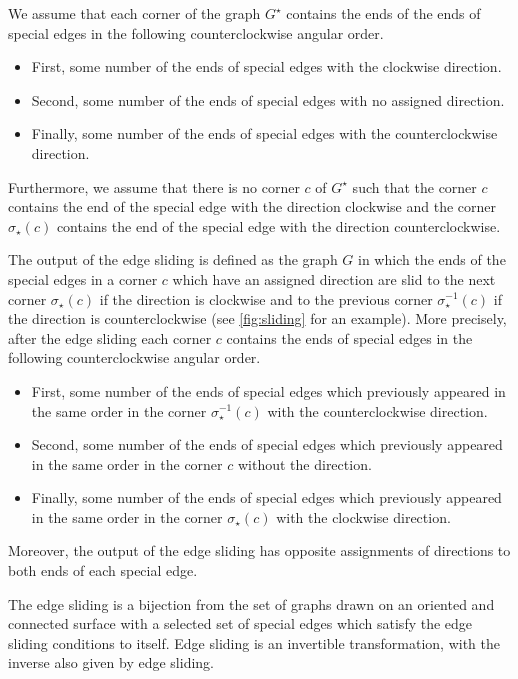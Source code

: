 \documentclass[submission]{FPSAC2021}
\DeclareMathOperator{\res}{\star}
\begin{document}
We assume that each corner of the 
graph $G^{\res}$ contains the ends 
of the ends of special edges in the 
following  counterclockwise angular 
order.  
\begin{itemize}

\item First, some number of the 
		ends of special edges 
		with the clockwise 
		direction.

\item Second, some number of the 
		ends of special edges with 
		no assigned direction. 
\item Finally, some number of the
		ends of special edges with 
		the counterclockwise 
		direction. 
\end{itemize}  
Furthermore, we assume that there is no 
corner $c$ of $G^{\res}$ such that the corner 
$c$ contains the end of the special 
edge with the direction clockwise and 
the corner $\sigma_{\res}(c)$ contains the end 
of the  special edge with the direction 
counterclockwise.

The output of the edge sliding is defined 
as the graph $G$ in which the ends of the 
special edges in a corner $c$ which have 
an assigned direction are slid to the 
next corner $\sigma_{\res}(c)$ if the direction 
is clockwise and to the previous corner 
$\sigma_{\res}^{-1}(c)$ if the direction is 
counterclockwise (see \cref{fig:sliding} 
for an example). More precisely, after 
the edge sliding each corner $c$ contains 
the ends of special edges in the following 
counterclockwise angular order.  
\begin{itemize}

\item First, some number of the ends 
		of special edges which 
		previously appeared in the 
		same order in the corner 
		$\sigma_{\res}^{-1}(c)$
		with the counterclockwise 
		direction.
\item Second, some number of the ends 
		of special edges which 
		previously appeared in the 
		same order in the corner $c$
		without the direction. 
\item Finally, some number of the ends 
		of special edges which previously 
		appeared in the same order 
		in the corner $\sigma_{\res}(c)$
		with the clockwise direction.
\end{itemize}  
Moreover, the output of the edge sliding
has opposite assignments of directions to
both ends of each special edge.

The edge sliding is a bijection from the 
set of graphs drawn on an oriented and 
connected surface with a selected set of 
special edges which satisfy the edge sliding 
conditions to itself. Edge sliding is an 
invertible transformation, with the inverse 
also given by edge sliding. 
\end{document}
